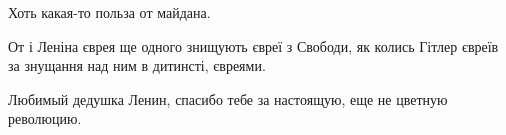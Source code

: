 \begin{itemize}



Хоть какая-то польза от майдана.

От і Леніна єврея ще одного знищують євреї з Свободи, як колись Гітлер євреїв за знущання над ним в дитинсті, євреями.

Любимый дедушка Ленин, спасибо тебе за настоящую, еще не цветную революцию.

\end{itemize} %
